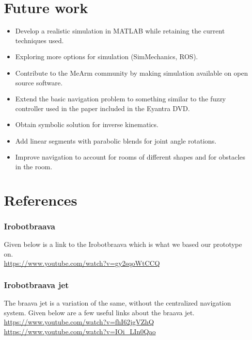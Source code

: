 \documentclass[12pt]{article}
\begin{document}
\part{Future work}

\begin{itemize}
\item Develop a realistic simulation in MATLAB while retaining the current techniques used.
\item Exploring more options for simulation (SimMechanics, ROS).
\item Contribute to the MeArm community by making simulation available on open source software.
\item Extend the basic navigation problem to something similar to the fuzzy controller used in the paper included in the Eyantra DVD.
\item Obtain symbolic solution for inverse kinematics.
\item Add linear segments with parabolic blends for joint angle rotations.
\item Improve navigation to account for rooms of different shapes and for obstacles in the room.
\end{itemize}

\part{References}

\section{Irobotbraava}
Given below is a link to the Irobotbraava which is what we based our prototype on.\\
\url{https://www.youtube.com/watch?v=gy2sqoWtCCQ}

\section{Irobotbraava jet}
The braava jet is a variation of the same, without the centralized navigation system.
Given below are a few useful links about the braava jet.\\
\url{https://www.youtube.com/watch?v=fhI62jgVZhQ}\\
\url{https://www.youtube.com/watch?v=IOi_LIn0Qao} 
\end{document}
